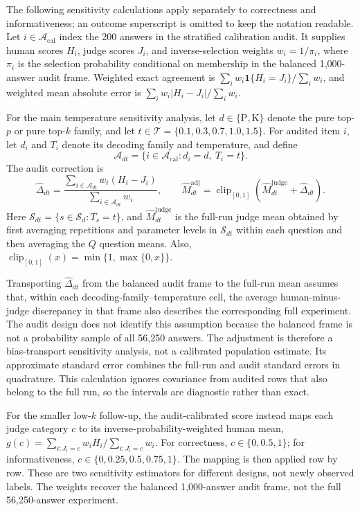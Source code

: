 \documentclass[11pt]{article}
\begin{document}
The following sensitivity calculations apply separately to correctness and
informativeness; an outcome superscript is omitted to keep the notation
readable. Let $i\in\mathcal A_{\mathrm{cal}}$ index the 200 answers in the
stratified calibration audit. It supplies human scores $H_i$, judge scores
$J_i$, and inverse-selection weights $w_i=1/\pi_i$, where $\pi_i$ is the
selection probability conditional on membership in the balanced 1,000-answer
audit frame. Weighted exact agreement is
$\sum_i w_i\mathbf 1\{H_i=J_i\}/\sum_i w_i$, and weighted mean absolute error
is $\sum_i w_i|H_i-J_i|/\sum_i w_i$.

For the main temperature sensitivity analysis, let
$d\in\{\mathrm P,\mathrm K\}$ denote the pure top-$p$ or pure top-$k$ family,
and let $t\in\mathcal T=\{0.1,0.3,0.7,1.0,1.5\}$. For audited item $i$, let
$d_i$ and $T_i$ denote its decoding family and temperature, and define
\[
 \mathcal A_{dt}=\{i\in\mathcal A_{\mathrm{cal}}:d_i=d,\ T_i=t\}.
\]
The audit correction is
\[
 \widehat\Delta_{dt}=
 \frac{\sum_{i\in\mathcal A_{dt}}w_i(H_i-J_i)}
 {\sum_{i\in\mathcal A_{dt}}w_i},\qquad
 \widehat M^{\mathrm{adj}}_{dt}=
 \operatorname{clip}_{[0,1]}(\widehat M^{\mathrm{judge}}_{dt}+\widehat\Delta_{dt}).
\]
Here $\mathcal S_{dt}=\{s\in\mathcal S_d:T_s=t\}$, and
$\widehat M^{\mathrm{judge}}_{dt}$ is the full-run judge mean obtained by first
averaging repetitions and parameter levels in $\mathcal S_{dt}$ within each
question and then averaging the $Q$ question means. Also,
$\operatorname{clip}_{[0,1]}(x)=\min\{1,\max\{0,x\}\}$.

Transporting $\widehat\Delta_{dt}$ from the balanced audit frame to the full-run
mean assumes that, within each decoding-family--temperature cell, the average
human-minus-judge discrepancy in that frame also describes the corresponding
full experiment. The audit design does not identify this assumption because the
balanced frame is not a probability sample of all 56,250 answers. The
adjustment is therefore a bias-transport sensitivity analysis, not a calibrated
population estimate. Its approximate standard error combines the full-run and
audit standard errors in quadrature. This calculation ignores covariance from
audited rows that also belong to the full run, so the intervals are diagnostic
rather than exact.

For the smaller low-$k$ follow-up, the audit-calibrated score instead maps each
judge category $c$ to its inverse-probability-weighted human mean,
$g(c)=\sum_{i:J_i=c}w_iH_i/\sum_{i:J_i=c}w_i$. For correctness,
$c\in\{0,0.5,1\}$; for informativeness,
$c\in\{0,0.25,0.5,0.75,1\}$. The mapping is then applied row by row. These are
two sensitivity estimators for different designs, not newly observed labels.
The weights recover the balanced 1,000-answer audit frame, not the full
56,250-answer experiment.
\end{document}
